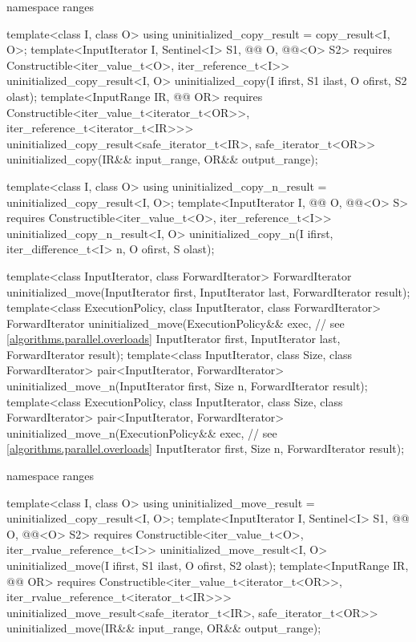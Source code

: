 \begin{codeblock}
{  namespace ranges {
    template<class I, class O>
    using uninitialized_copy_result = copy_result<I, O>;
    template<InputIterator I, Sentinel<I> S1,
             @@ O, @@<O> S2>
      requires Constructible<iter_value_t<O>, iter_reference_t<I>>
        uninitialized_copy_result<I, O>
          uninitialized_copy(I ifirst, S1 ilast, O ofirst, S2 olast);
    template<InputRange IR, @@ OR>
      requires Constructible<iter_value_t<iterator_t<OR>>, iter_reference_t<iterator_t<IR>>>
        uninitialized_copy_result<safe_iterator_t<IR>, safe_iterator_t<OR>>
          uninitialized_copy(IR&& input_range, OR&& output_range);

    template<class I, class O>
      using uninitialized_copy_n_result = uninitialized_copy_result<I, O>;
    template<InputIterator I, @@ O, @@<O> S>
      requires Constructible<iter_value_t<O>, iter_reference_t<I>>
        uninitialized_copy_n_result<I, O>
          uninitialized_copy_n(I ifirst, iter_difference_t<I> n, O ofirst, S olast);
  }

  template<class InputIterator, class ForwardIterator>
    ForwardIterator uninitialized_move(InputIterator first, InputIterator last,
                                       ForwardIterator result);
  template<class ExecutionPolicy, class InputIterator, class ForwardIterator>
    ForwardIterator uninitialized_move(ExecutionPolicy&& exec, // see \ref{algorithms.parallel.overloads}
                                       InputIterator first, InputIterator last,
                                       ForwardIterator result);
  template<class InputIterator, class Size, class ForwardIterator>
    pair<InputIterator, ForwardIterator> uninitialized_move_n(InputIterator first, Size n,
                                                              ForwardIterator result);
  template<class ExecutionPolicy, class InputIterator, class Size, class ForwardIterator>
    pair<InputIterator, ForwardIterator> uninitialized_move_n(ExecutionPolicy&& exec, // see \ref{algorithms.parallel.overloads}
                                                              InputIterator first, Size n,
                                                              ForwardIterator result);

  namespace ranges {
    template<class I, class O>
      using uninitialized_move_result = uninitialized_copy_result<I, O>;
    template<InputIterator I, Sentinel<I> S1,
             @@ O, @@<O> S2>
      requires Constructible<iter_value_t<O>, iter_rvalue_reference_t<I>>
        uninitialized_move_result<I, O>
          uninitialized_move(I ifirst, S1 ilast, O ofirst, S2 olast);
    template<InputRange IR, @@ OR>
      requires Constructible<iter_value_t<iterator_t<OR>>,
                             iter_rvalue_reference_t<iterator_t<IR>>>
        uninitialized_move_result<safe_iterator_t<IR>, safe_iterator_t<OR>>
          uninitialized_move(IR&& input_range, OR&& output_range);

}}
\end{codeblock}
